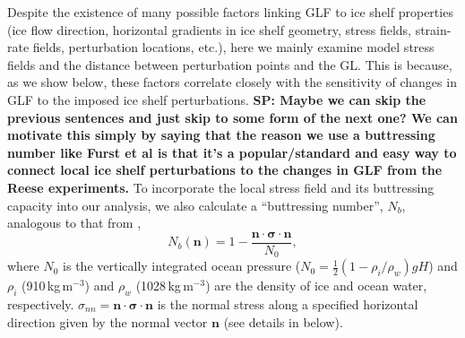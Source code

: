 \documentclass[tc, manuscript]{copernicus}
\begin{document}
Despite the existence of many possible factors linking GLF to ice shelf properties (ice flow direction, horizontal gradients in ice shelf geometry, stress fields, strain-rate fields, perturbation locations, etc.), here we mainly examine model stress fields and the distance between perturbation points and the GL. This is because, as we show below, these factors correlate closely with the sensitivity of changes in GLF to the imposed ice shelf perturbations. \textbf{SP: Maybe we can skip the previous sentences and just skip to some form of the next one? We can motivate this simply by saying that the reason we use a buttressing number like Furst et al is that it's a popular/standard and easy way to connect local ice shelf perturbations to the changes in GLF from the Reese experiments.} To incorporate the local stress field and its buttressing capacity into our analysis, we also calculate a ``buttressing number'', $N_b$, analogous to that from \citet{furst2016},
\begin{equation}
N_b\left(\mathbf{n}\right)=1-\frac{\mathbf{n}\cdot\mathbf{\sigma}\cdot\mathbf{n}}{N_0},
\label{butN}
\end{equation}
where $N_0$ is the vertically integrated ocean pressure ($N_0=\frac{1}{2}\left(1-{\rho_i}/{\rho_w}\right)gH$) and $\rho_i$ (910\,kg\,m$^{-3}$) and $\rho_w$ (1028\,kg\,m$^{-3}$) are the density of ice and ocean water, respectively. $\sigma_{nn}=\mathbf{n}\cdot\mathbf{\sigma}\cdot\mathbf{n}$ is the normal stress along a specified horizontal direction given by the normal vector $\mathbf{n}$ (see details in below).

%
\end{document}
